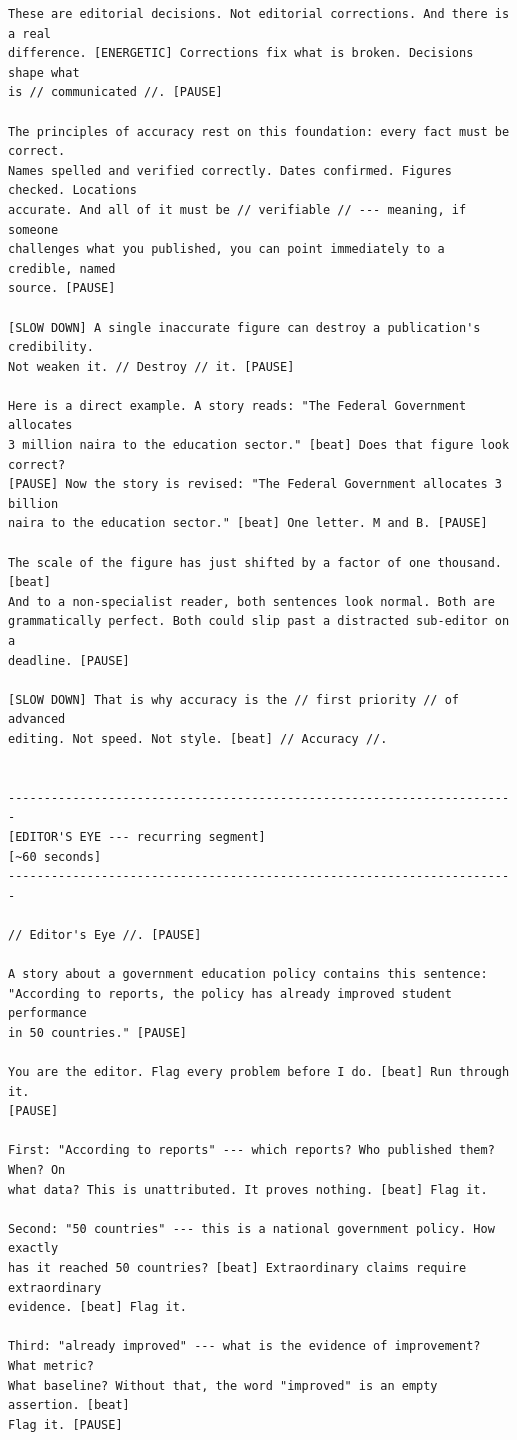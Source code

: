 {\begin{Verbatim}
These are editorial decisions. Not editorial corrections. And there is a real
difference. [ENERGETIC] Corrections fix what is broken. Decisions shape what
is // communicated //. [PAUSE]

The principles of accuracy rest on this foundation: every fact must be correct.
Names spelled and verified correctly. Dates confirmed. Figures checked. Locations
accurate. And all of it must be // verifiable // --- meaning, if someone
challenges what you published, you can point immediately to a credible, named
source. [PAUSE]

[SLOW DOWN] A single inaccurate figure can destroy a publication's credibility.
Not weaken it. // Destroy // it. [PAUSE]

Here is a direct example. A story reads: "The Federal Government allocates
3 million naira to the education sector." [beat] Does that figure look correct?
[PAUSE] Now the story is revised: "The Federal Government allocates 3 billion
naira to the education sector." [beat] One letter. M and B. [PAUSE]

The scale of the figure has just shifted by a factor of one thousand. [beat]
And to a non-specialist reader, both sentences look normal. Both are
grammatically perfect. Both could slip past a distracted sub-editor on a
deadline. [PAUSE]

[SLOW DOWN] That is why accuracy is the // first priority // of advanced
editing. Not speed. Not style. [beat] // Accuracy //.


-----------------------------------------------------------------------
[EDITOR'S EYE --- recurring segment]
[~60 seconds]
-----------------------------------------------------------------------

// Editor's Eye //. [PAUSE]

A story about a government education policy contains this sentence:
"According to reports, the policy has already improved student performance
in 50 countries." [PAUSE]

You are the editor. Flag every problem before I do. [beat] Run through it.
[PAUSE]

First: "According to reports" --- which reports? Who published them? When? On
what data? This is unattributed. It proves nothing. [beat] Flag it.

Second: "50 countries" --- this is a national government policy. How exactly
has it reached 50 countries? [beat] Extraordinary claims require extraordinary
evidence. [beat] Flag it.

Third: "already improved" --- what is the evidence of improvement? What metric?
What baseline? Without that, the word "improved" is an empty assertion. [beat]
Flag it. [PAUSE]


\end{Verbatim}}
